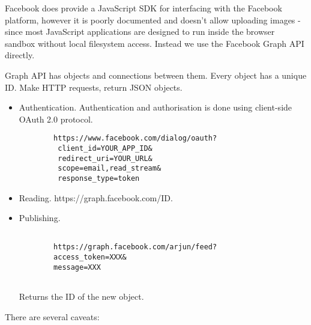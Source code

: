 Facebook does provide a JavaScript SDK for interfacing with the Facebook platform, however it is poorly documented and doesn't allow uploading images - since most JavaScript applications are designed to run inside the browser sandbox without local filesystem access. Instead we use the Facebook Graph API directly.

Graph API has objects and connections between them. Every object has a unique ID. Make HTTP requests, return JSON objects.


\begin{itemize}

    \item Authentication. Authentication and authorisation is done using client-side OAuth 2.0 protocol.
    
    \begin{lstlisting}
        https://www.facebook.com/dialog/oauth?
         client_id=YOUR_APP_ID&
         redirect_uri=YOUR_URL&
         scope=email,read_stream&
         response_type=token
    \end{lstlisting}
    
    \item Reading. https://graph.facebook.com/ID.
    
    \item Publishing. \begin{lstlisting}
    
        https://graph.facebook.com/arjun/feed?
        access_token=XXX&
        message=XXX
    
    \end{lstlisting}
    
    Returns the ID of the new object.

\end{itemize}

There are several caveats:


